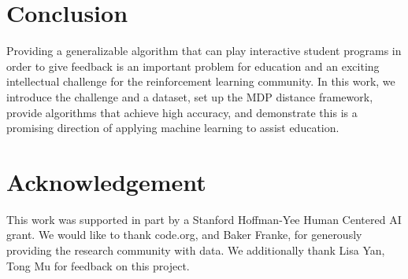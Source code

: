 \documentclass{article}
\begin{document}
\section{Conclusion}
Providing a generalizable algorithm that can play interactive student programs in order to give feedback is an important problem for education and an exciting intellectual challenge for the reinforcement learning community. In this work, we introduce the challenge and a dataset, set up the MDP distance framework, provide algorithms that achieve high accuracy, and demonstrate this is a promising direction of applying machine learning to assist education.

\section*{Acknowledgement} 
This work was supported in part by a Stanford Hoffman-Yee Human Centered AI grant. We would like to thank code.org, and Baker Franke, for generously providing the research community with data. We additionally thank Lisa Yan, Tong Mu for feedback on this project.








\end{document}
